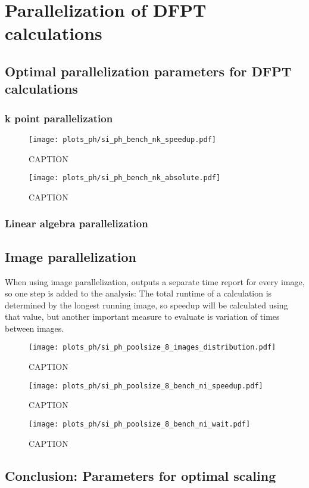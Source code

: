 \documentclass[main.tex]{subfiles}
\begin{document}
\chapter{Parallelization of DFPT calculations}

\section{Optimal parallelization parameters for DFPT calculations}

\subsection{k point parallelization}

\begin{figure}[ht!]
    \centering
    \texttt{[image: plots\_ph/si\_ph\_bench\_nk\_speedup.pdf]}
    \caption{CAPTION}
    \label{fig:scaling_ph_nk_si}
\end{figure}

\begin{figure}[ht!]
    \centering
    \texttt{[image: plots\_ph/si\_ph\_bench\_nk\_absolute.pdf]}
    \caption{CAPTION}
    \label{fig:scaling_ph_nk_si_absolute}
\end{figure}

\subsection{Linear algebra parallelization}

\section{Image parallelization}

When using image parallelization, \QE outputs a separate time report for every image, so one step is added to the analysis:
The total runtime of a calculation is determined by the longest running image, so speedup will be calculated using that value, but another important measure to evaluate is variation of times between images.
\begin{figure}[ht!]
    \centering
    \texttt{[image: plots\_ph/si\_ph\_poolsize\_8\_images\_distribution.pdf]}
    \caption{CAPTION}
    \label{fig:scaling_ph_ni_poolsize_8_si_distribution}
\end{figure}

\begin{figure}[ht!]
    \centering
    \texttt{[image: plots\_ph/si\_ph\_poolsize\_8\_bench\_ni\_speedup.pdf]}
    \caption{CAPTION}
    \label{fig:scaling_ph_ni_poolsize_8_si}
\end{figure}

\begin{figure}[ht!]
    \centering
    \texttt{[image: plots\_ph/si\_ph\_poolsize\_8\_bench\_ni\_wait.pdf]}
    \caption{CAPTION}
    \label{fig:scaling_ph_ni_poolsize_8_si_wait}
\end{figure}

\section{Conclusion: Parameters for optimal scaling}
\end{document}
